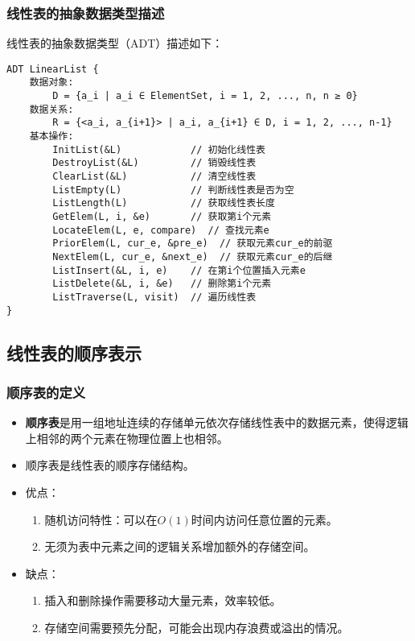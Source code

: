 \documentclass{../../note}
\begin{document}
\subsubsection{线性表的抽象数据类型描述}

线性表的抽象数据类型（ADT）描述如下：

\begin{verbatim}
ADT LinearList {
    数据对象:
        D = {a_i | a_i ∈ ElementSet, i = 1, 2, ..., n, n ≥ 0}
    数据关系:
        R = {<a_i, a_{i+1}> | a_i, a_{i+1} ∈ D, i = 1, 2, ..., n-1}
    基本操作:
        InitList(&L)            // 初始化线性表
        DestroyList(&L)         // 销毁线性表
        ClearList(&L)           // 清空线性表
        ListEmpty(L)            // 判断线性表是否为空
        ListLength(L)           // 获取线性表长度
        GetElem(L, i, &e)       // 获取第i个元素
        LocateElem(L, e, compare)  // 查找元素e
        PriorElem(L, cur_e, &pre_e)  // 获取元素cur_e的前驱
        NextElem(L, cur_e, &next_e)  // 获取元素cur_e的后继
        ListInsert(&L, i, e)    // 在第i个位置插入元素e
        ListDelete(&L, i, &e)   // 删除第i个元素
        ListTraverse(L, visit)  // 遍历线性表
}
\end{verbatim}

\subsection{线性表的顺序表示}

\subsubsection{顺序表的定义}
\begin{itemize}
  \item \textbf{顺序表}是用一组地址连续的存储单元依次存储线性表中的数据元素，使得逻辑上相邻的两个元素在物理位置上也相邻。
  \item 顺序表是线性表的顺序存储结构。
  \item 优点：
    \begin{enumerate}
      \item 随机访问特性：可以在$O(1)$时间内访问任意位置的元素。
      \item 无须为表中元素之间的逻辑关系增加额外的存储空间。
    \end{enumerate}
  \item 缺点：
    \begin{enumerate}
      \item 插入和删除操作需要移动大量元素，效率较低。
      \item 存储空间需要预先分配，可能会出现内存浪费或溢出的情况。
    \end{enumerate}
\end{itemize}
\end{document}
